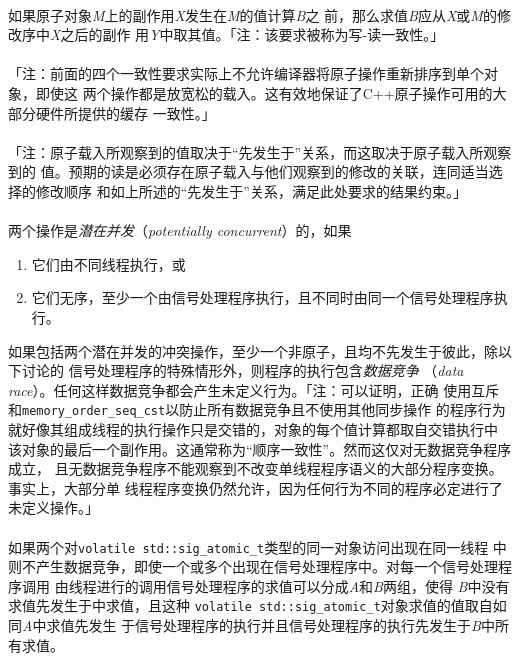 \paragraph{}
如果原子对象\textit{M}上的副作用\textit{X}发生在\textit{M}的值计算\textit{B}之
前，那么求值\textit{B}应从\textit{X}或\textit{M}的修改序中\textit{X}之后的副作
用\textit{Y}中取其值。「注：该要求被称为写-读一致性。」

\paragraph{}
「注：前面的四个一致性要求实际上不允许编译器将原子操作重新排序到单个对象，即使这
两个操作都是放宽松的载入。这有效地保证了C++原子操作可用的大部分硬件所提供的缓存
一致性。」

\paragraph{}
「注：原子载入所观察到的值取决于``先发生于''关系，而这取决于原子载入所观察到的
值。预期的读是必须存在原子载入与他们观察到的修改的关联，连同适当选择的修改顺序
和如上所述的``先发生于''关系，满足此处要求的结果约束。」

\paragraph{}
两个操作是\textit{潜在并发}（\textit{potentially concurrent}）的，如果
\begin{enumerate}
  \item{它们由不同线程执行，或}
  \item{它们无序，至少一个由信号处理程序执行，且不同时由同一个信号处理程序执行。}
\end{enumerate}
如果包括两个潜在并发的冲突操作，至少一个非原子，且均不先发生于彼此，除以下讨论的
信号处理程序的特殊情形外，则程序的执行包含\textit{数据竞争}
（\textit{data race}）。任何这样数据竞争都会产生未定义行为。「注：可以证明，正确
使用互斥和\texttt{memory\_order\_seq\_cst}以防止所有数据竞争且不使用其他同步操作
的程序行为就好像其组成线程的执行操作只是交错的，对象的每个值计算都取自交错执行中
该对象的最后一个副作用。这通常称为``顺序一致性''。然而这仅对无数据竞争程序成立，
且无数据竞争程序不能观察到不改变单线程程序语义的大部分程序变换。事实上，大部分单
线程程序变换仍然允许，因为任何行为不同的程序必定进行了未定义操作。」

\paragraph{}
如果两个对\texttt{volatile std::sig\_atomic\_t}类型的同一对象访问出现在同一线程
中则不产生数据竞争，即使一个或多个出现在信号处理程序中。对每一个信号处理程序调用
由线程进行的调用信号处理程序的求值可以分成\textit{A}和\textit{B}两组，使得
\textit{B}中没有求值先发生于中求值，且这种
\texttt{volatile std::sig\_atomic\_t}对象求值的值取自如同\textit{A}中求值先发生
于信号处理程序的执行并且信号处理程序的执行先发生于\textit{B}中所有求值。

